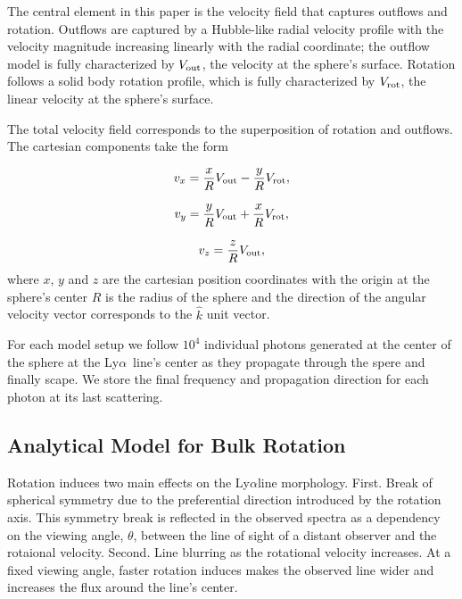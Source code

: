 \documentclass[a4,useAMS,usenatbib,usegraphicx]{mn2e}
\newcommand{\lya}{Ly$\alpha$}
\begin{document}
The central element in this paper is the velocity field that captures
outflows and rotation.
Outflows are captured by a Hubble-like radial velocity profile with
the velocity magnitude increasing linearly with the radial
coordinate; the outflow model is fully characterized by $V_{\rm out}$, the
velocity at the sphere's surface.
Rotation follows a solid body rotation profile, which is fully
characterized by $V_{\rm rot}$, the linear velocity at the sphere's surface.

The total velocity field corresponds to the superposition of rotation and
outflows.
The cartesian components take the form

\begin{equation}
	v_{x}=\frac{x}{R}V_{\rm out}-\frac{y}{R}V_{\rm rot} ,
	\label{eq:vx}
\end{equation}

\begin{equation}
	v_{y}=\frac{y}{R}V_{\rm out}+\frac{x}{R}V_{\rm rot} ,
	\label{eq:vy}
\end{equation}

\begin{equation}
	v_{z}=\frac{z}{R}V_{\rm out},
	\label{eq:vz}
\end{equation}
%
where $x$, $y$ and $z$ are the cartesian position coordinates with the
origin at the sphere's center $R$ is the radius of the sphere and the
direction of the angular velocity vector corresponds to the $\hat{k}$
unit vector. 

For each model setup we follow $10^4$ individual photons generated at
the center of the sphere at the \lya\ line's center as they propagate
through the spere and finally scape.
We store the final frequency and propagation direction for each photon
at its last scattering.  

\subsection{Analytical Model for Bulk Rotation}


Rotation induces two main effects on the \lya line morphology.
First. Break of spherical symmetry due to the 
  preferential direction introduced by the rotation axis.
  This symmetry break is reflected in the observed spectra as a
  dependency on the viewing angle, $\theta$, between the line of sight
  of a distant observer and the rotaional velocity.    
Second. Line blurring as the rotational velocity increases.
  At a fixed viewing angle, faster rotation induces makes the observed
  line wider and increases the flux around the line's center. 
\end{document}
